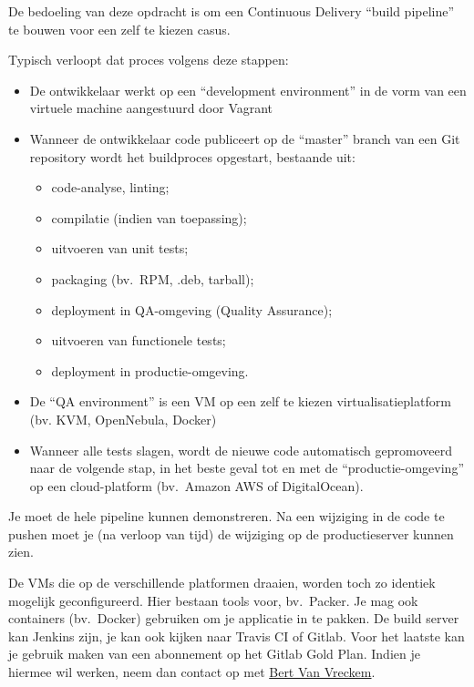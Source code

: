 De bedoeling van deze opdracht is om een Continuous Delivery ``build pipeline'' te bouwen voor een zelf te kiezen casus.

Typisch verloopt dat proces volgens deze stappen:

\begin{itemize}
\item De ontwikkelaar werkt op een ``development environment'' in de vorm van een virtuele machine aangestuurd door Vagrant
\item Wanneer de ontwikkelaar code publiceert op de ``master'' branch van een Git repository wordt het buildproces opgestart, bestaande uit:

  \begin{itemize}
  \item code-analyse, linting;
  \item compilatie (indien van toepassing);
  \item uitvoeren van unit tests;
  \item packaging (bv.~RPM, .deb, tarball);
  \item deployment in QA-omgeving (Quality Assurance);
  \item uitvoeren van functionele tests;
  \item deployment in productie-omgeving.
  \end{itemize}

\item De ``QA environment'' is een VM op een zelf te kiezen virtualisatieplatform (bv. KVM, OpenNebula, Docker)
\item Wanneer alle tests slagen, wordt de nieuwe code automatisch gepromoveerd naar de volgende stap, in het beste geval tot en met de ``productie-omgeving'' op een cloud-platform (bv.\ Amazon AWS of DigitalOcean).
\end{itemize}

Je moet de hele pipeline kunnen demonstreren. Na een wijziging in de code te pushen moet je (na verloop van tijd) de wijziging op de productieserver kunnen zien.

De VMs die op de verschillende platformen draaien, worden toch zo identiek mogelijk geconfigureerd. Hier bestaan tools voor, bv.\ Packer. Je mag ook containers (bv.\ Docker) gebruiken om je applicatie in te pakken. De build server kan Jenkins zijn, je kan ook kijken naar Travis CI of Gitlab. Voor het laatste kan je gebruik maken van een abonnement op het Gitlab Gold Plan. Indien je hiermee wil werken, neem dan contact op met \href{mailto:bert.vanvreckem@hogent.be}{Bert Van Vreckem}.

